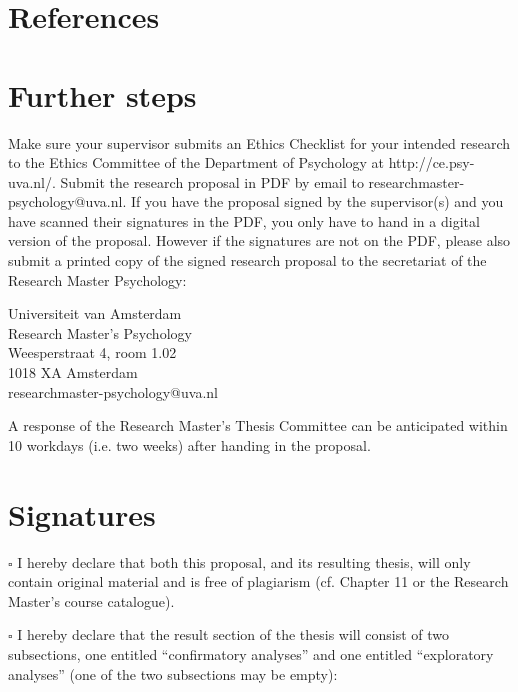 \documentclass[12pt,a4paper]{article}\usepackage[]{graphicx}\usepackage[]{color}
\begin{document}
\noindent
\wordcount

\renewcommand{\bibsection}{} %
\section{References}


\section{Further steps}
Make sure your supervisor submits an Ethics Checklist for your intended research to the Ethics Committee of the Department of Psychology at http://ce.psy-uva.nl/. Submit the research proposal in PDF by email to researchmaster-psychology@uva.nl. 
If you have the proposal signed by the supervisor(s) and you have scanned their signatures in the PDF, you only have to hand in a digital version of the proposal. However if the signatures are not on the PDF, please also submit a printed copy of the signed research proposal to the secretariat of the Research Master Psychology:
\vspace{\baselineskip}

\noindent
Universiteit van Amsterdam \\
Research Master’s Psychology \\
Weesperstraat 4, room 1.02 \\
1018 XA Amsterdam \\
researchmaster-psychology@uva.nl
\vspace{\baselineskip}

\noindent
A response of the Research Master's Thesis Committee can be anticipated within 10 workdays (i.e. two weeks) after handing in the proposal. 

\section{Signatures}
$\square$ I hereby declare that both this proposal, and its resulting thesis, will only contain original material and is free of plagiarism (cf. Chapter 11 or the Research Master's course catalogue).
\vspace{\baselineskip}

\noindent
$\square$ I hereby declare that the result section of the thesis will consist of two subsections, one entitled ``confirmatory analyses'' and one entitled ``exploratory analyses'' (one of the two subsections may be empty):
\end{document}
